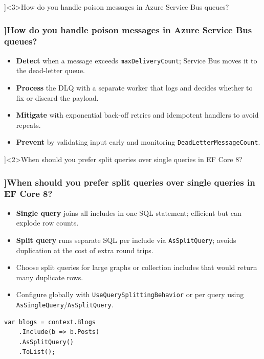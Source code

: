\QuestionSlide[\CategoryBadge[AuthColor!20]{Cloud}]<3>{How do you handle poison messages in Azure Service Bus queues?}
\begin{frame}[fragile]
  \frametitle{\AnswerTitle[\CategoryBadge[AuthColor!20]{Cloud}]{How do you handle poison messages in Azure Service Bus queues?}}

  {\footnotesize
  \begin{itemize}
    \item \textbf{Detect} when a message exceeds \texttt{maxDeliveryCount}; Service Bus moves it to the dead-letter queue.
    \item \textbf{Process} the DLQ with a separate worker that logs and decides whether to fix or discard the payload.
    \item \textbf{Mitigate} with exponential back-off retries and idempotent handlers to avoid repeats.
    \item \textbf{Prevent} by validating input early and monitoring \texttt{DeadLetterMessageCount}.
  \end{itemize}
  }
\end{frame}

\QuestionSlide[\CategoryBadge[AuthColor!20]{Cloud}]<2>{When should you prefer split queries over single queries in EF Core 8?}
\begin{frame}[fragile]
  \frametitle{\AnswerTitle[\CategoryBadge[AuthColor!20]{Cloud}]{When should you prefer split queries over single queries in EF Core 8?}}

  {\footnotesize
  \begin{itemize}
    \item \textbf{Single query} joins all includes in one SQL statement; efficient but can explode row counts.
    \item \textbf{Split query} runs separate SQL per include via \texttt{AsSplitQuery}; avoids duplication at the cost of extra round trips.
    \item Choose split queries for large graphs or collection includes that would return many duplicate rows.
    \item Configure globally with \texttt{UseQuerySplittingBehavior} or per query using \texttt{AsSingleQuery}/\texttt{AsSplitQuery}.
  \end{itemize}
  }

  \begin{verbatim}
var blogs = context.Blogs
    .Include(b => b.Posts)
    .AsSplitQuery()
    .ToList();
  \end{verbatim}
\end{frame}

